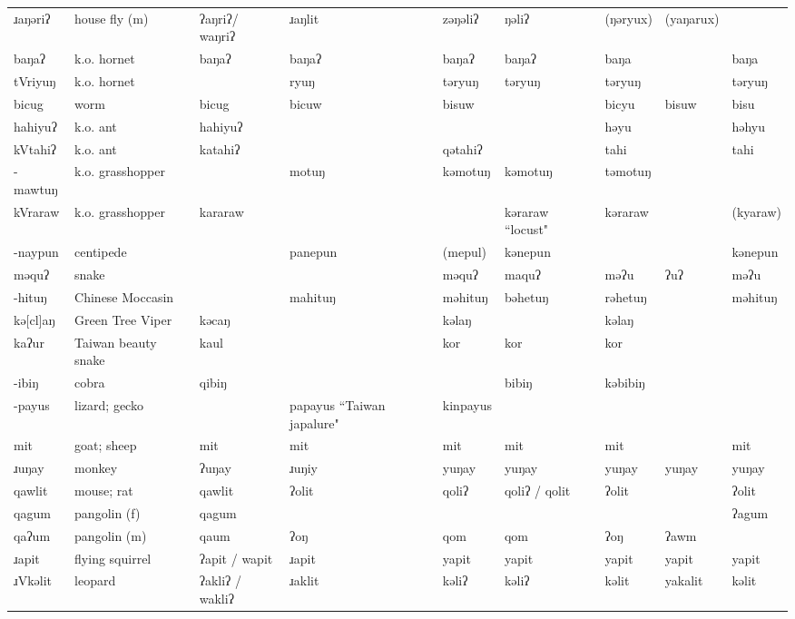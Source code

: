 \begin{landscape}
\begin{longtable}{*{9}{>{\raggedright\arraybackslash}p{}}}
\text{*}ɹaŋəriʔ & house fly (m) & ʔaŋriʔ/ \newline waŋriʔ & ɹaŋlit & zəŋəliʔ & ŋəliʔ & (ŋəryux) & (yaŋarux) & \\
\text{*}baŋaʔ & k.o. hornet & baŋaʔ & baŋaʔ & baŋaʔ & baŋaʔ & baŋa &  & baŋa\\
\text{*}tVriyuŋ & k.o. hornet &  & ryuŋ & təryuŋ & təryuŋ & təryuŋ &  & təryuŋ\\
\text{*}bicug & worm & bicug & bicuw & bisuw &  & bicyu & bisuw & bisu\\
\text{*}hahiyuʔ & k.o. ant & hahiyuʔ &  &  &  & həyu &  & həhyu\\
\text{*}kVtahiʔ & k.o. ant & katahiʔ &  & qətahiʔ &  & tahi &  & tahi\\
\text{*}-mawtuŋ & k.o. grasshopper &  & motuŋ & kəmotuŋ & kəmotuŋ & təmotuŋ &  & \\
\text{*}kVraraw & k.o. grasshopper & kararaw &  &  & kəraraw ``locust" & kəraraw &  & (kyaraw)\\
\text{*}-naypun & centipede &  & panepun & (mepul) & kənepun &  &  & kənepun\\
\text{*}məquʔ & snake &  &  & məquʔ & maquʔ & məʔu & ʔuʔ & məʔu\\
\text{*}-hituŋ & Chinese Moccasin &  & mahituŋ & məhituŋ & bəhetuŋ & rəhetuŋ &  & məhituŋ\\
\text{*}kə[cl]aŋ & Green Tree Viper & kəcaŋ &  & kəlaŋ &  & kəlaŋ &  & \\
\text{*}kaʔur & Taiwan beauty snake & kaul &  & kor & kor & kor &  & \\
\text{*}-ibiŋ & cobra & qibiŋ &  &  & bibiŋ & kəbibiŋ &  & \\
\text{*}-payus & lizard; gecko &  & papayus ``Taiwan japalure" & kinpayus &  &  &  & \\
\text{*}mit & goat; sheep & mit & mit & mit & mit & mit &  & mit\\
\text{*}ɹuŋay & monkey & ʔuŋay & ɹuŋiy & yuŋay & yuŋay & yuŋay & yuŋay & yuŋay\\
\text{*}qawlit & mouse; rat & qawlit & ʔolit & qoliʔ & qoliʔ / qolit & ʔolit &  & ʔolit\\
\text{*}qagum & pangolin (f) & qagum &  &  &  &  &  & ʔagum\\
\text{*}qaʔum & pangolin (m) & qaum & ʔoŋ & qom & qom & ʔoŋ & ʔawm & \\
\text{*}ɹapit & flying squirrel & ʔapit / wapit & ɹapit & yapit & yapit & yapit & yapit & yapit\\
\text{*}ɹVkəlit & leopard & ʔakliʔ / wakliʔ & ɹaklit & kəliʔ & kəliʔ & kəlit & yakalit & kəlit\\

\end{longtable}
\end{landscape}
